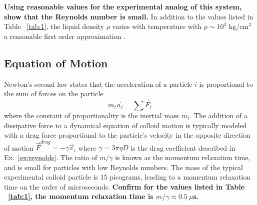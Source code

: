 \documentclass[twocolumn,preprintnumbers,amsmath,amssymb,aps,prx]{revtex4}
\begin{document}
  {\bf Using reasonable values for the
  experimental analog of this system, 
  show that the Reynolds number is small.}
  In addition to the values listed in Table ~\ref{tab:1}, 
  the liquid density $\rho$ varies with temperature
  with $\rho \sim 10^3$ kg/cm$^3$ a reasonable
  first order approximation
  \cite{asce}.
  


\label{ex:reynolds}

\subsection{Equation of Motion}
  \label{ex:n2l}
  
  Newton's second law states that
  the acceleration of a particle $i$
  is proportional to 
  the sum of forces on the particle 
  \begin{equation}
  m_i \vec{a}_i = \sum \vec{F}_i
  \label{eq:n2l}
  \end{equation}
  where the constant of proportionality is the
  inertial mass $m_i$.  
  The addition of a dissipative force to a dynamical equation 
  of colloid motion 
  is typically modeled
  with a drag force proportional to the particle's velocity
  in the opposite direction of motion 
  $\vec{F}^{drag} = - \gamma \vec{v}_i$
  where $\gamma = 3 \pi \eta D$ is the drag coefficient
  described in Ex.~\ref{ex:reynolds}.
  The ratio of $m/\gamma$ is %
  known as the momentum relaxation time, %
  and is small for
  particles with low Reynolds numbers.
  The mass of the
  typical experimental colloid particle is $15$ picograms,
  leading to a momentum relaxation time
  on the order of microseconds.
  {\bf Confirm for the values listed in Table ~\ref{tab:1},
  the momentum relaxation time is 
  $m/\gamma \approx 0.5 ~\mu$s. }
  
\end{document}
